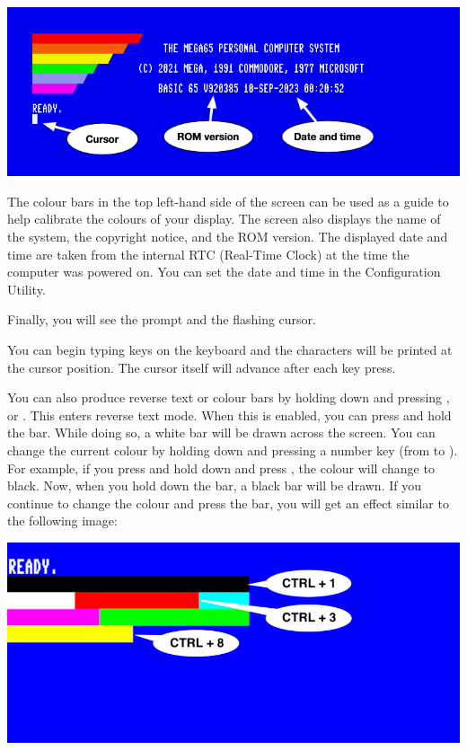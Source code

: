 \begin{center}
\includegraphics[width=0.9\linewidth]{images/introduction-screen/layout.png}
\end{center}

The colour bars in the top left-hand side of the screen can be used as a guide to help calibrate the colours of your display. The screen also displays the name of the system, the copyright notice, and the ROM version. The displayed date and time are taken from the internal RTC (Real-Time Clock) at the time the computer was powered on. You can set the date and time in the Configuration Utility.

Finally, you will see the  prompt and the flashing cursor.

You can begin typing keys on the keyboard and the characters will be printed at the cursor position. The cursor itself will advance after each key press.

You can also produce reverse text or colour bars by holding down  and pressing , or . This enters reverse text mode. When this is enabled, you can press and hold the  bar. While doing so, a white bar will be drawn across the screen.
You can change the current colour by holding  down and pressing a number key (from 
to ). For example, if you press and hold  down and press , the colour will
change to black. Now, when you hold down the  bar, a black bar will be drawn. If you continue to
change the colour and press the  bar, you will get an effect similar to the following image:

\begin{center}
\includegraphics[width=0.7\linewidth]{images/introduction-screen/colour-bars.png}
\end{center}

